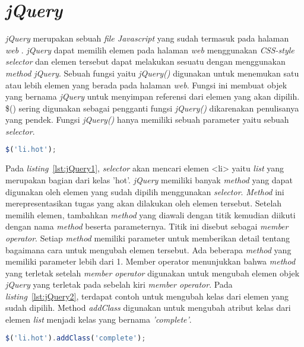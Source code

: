 \section{\textit{jQuery}}
\textit{jQuery} merupakan sebuah \textit{file Javascript} yang sudah termasuk pada halaman \textit{web} \cite{duckett2014javascript}. \textit{jQuery} dapat memilih elemen pada halaman \textit{web} menggunakan \textit{CSS-style selector} dan elemen tersebut dapat melakukan sesuatu dengan menggunakan \textit{method jQuery}. Sebuah fungsi yaitu \textit{jQuery()} digunakan untuk menemukan satu atau lebih elemen yang berada pada halaman \textit{web}. Fungsi ini membuat objek yang bernama \textit{jQuery} untuk menyimpan referensi dari elemen yang akan dipilih. \$() sering digunakan sebagai pengganti fungsi \textit{jQuery()} dikarenakan penulisanya yang pendek. Fungsi \textit{jQuery()} hanya memiliki sebuah parameter yaitu sebuah \textit{selector}.

\begin{lstlisting}[language=Javascript, caption=Mendapatkan elemen menggunakan \textit{CSS-style selector}, label={lst:jQuery1}]
	$('li.hot');
\end{lstlisting}

Pada \textit{listing}~\ref{lst:jQuery1}, \textit{selector} akan mencari elemen <li> yaitu \textit{list} yang merupakan bagian dari kelas 'hot'. \textit{jQuery} memiliki banyak \textit{method} yang dapat digunakan oleh elemen yang sudah dipilih menggunakan \textit{selector}. \textit{Method} ini merepresentasikan tugas yang akan dilakukan oleh elemen tersebut. Setelah memilih elemen, tambahkan \textit{method} yang diawali dengan titik kemudian diikuti dengan nama \textit{method} beserta parameternya. Titik ini disebut sebagai \textit{member operator}. Setiap \textit{method} memiliki parameter untuk memberikan detail tentang bagaimana cara untuk mengubah elemen tersebut. Ada beberapa \textit{method} yang memiliki parameter lebih dari 1.  Member operator menunjukkan bahwa \textit{method} yang terletak setelah \textit{member operator} digunakan untuk mengubah elemen objek \textit{jQuery} yang terletak pada sebelah kiri \textit{member operator}. Pada \textit{listing}~\ref{lst:jQuery2}, terdapat contoh untuk mengubah kelas dari elemen yang sudah dipilih. Method \textit{addClass} digunakan untuk mengubah atribut kelas dari elemen \textit{list} menjadi kelas yang bernama \textit{'complete'}. 

\begin{lstlisting}[language=Javascript, caption=Mengubah kelas dari elemen yang sudah dipilih, label={lst:jQuery2}]
	$('li.hot').addClass('complete');
\end{lstlisting}

